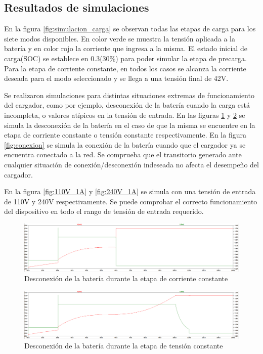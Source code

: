 \subsection{Resultados de simulaciones}
En la figura \ref{fig:simulacion_carga} se observan todas las etapas de carga para los siete modos
disponibles. En color verde se muestra la tensión aplicada a la batería y en
color rojo la corriente que ingresa a la misma. El estado inicial de carga(SOC)
se establece en 0.3(30\%) para poder simular la etapa de precarga.    
Para la etapa de corriente constante, en todos los casos se alcanza la corriente
deseada para el modo seleccionado y se llega a una tensión final de 42V.

Se realizaron simulaciones para distintas situaciones extremas de funcionamiento del cargador,
como por ejemplo, desconexión de la batería cuando la carga está incompleta,
o valores atípicos en la tensión de entrada.
En las figuras \ref{fig:desconexion_CC} y \ref{fig:desconexion_CV} se simula la
desconexión de la batería en el caso de que la misma se encuentre en la etapa de
corriente constante o tensión constante respectivamente. En la figura
\ref{fig:conexion} se simula la conexión de la batería cuando que el cargador
ya se encuentra conectado a la red. Se comprueba que el transitorio generado
ante cualquier situación de conexión/desconexión indeseada no afecta el
desempeño del cargador.

En la figura \ref{fig:110V_1A} y \ref{fig:240V_1A} se
simula con una tensión de entrada de 110V y 240V respectivamente. Se puede
comprobar el correcto funcionamiento del dispositivo en todo el rango de tensión
de entrada requerido.

\begin{figure}[H]
    \centering
    \includegraphics[width=\textwidth]{images/desconexion_CC.png}
    \caption{Desconexión de la batería durante la etapa de corriente constante}
    \label{fig:desconexion_CC}
\end{figure}

\begin{figure}
    \centering
    \includegraphics[width=\textwidth]{images/desconexion_CV.png}
    \caption{Desconexión de la batería durante la etapa de tensión constante}
    \label{fig:desconexion_CV}
\end{figure}

